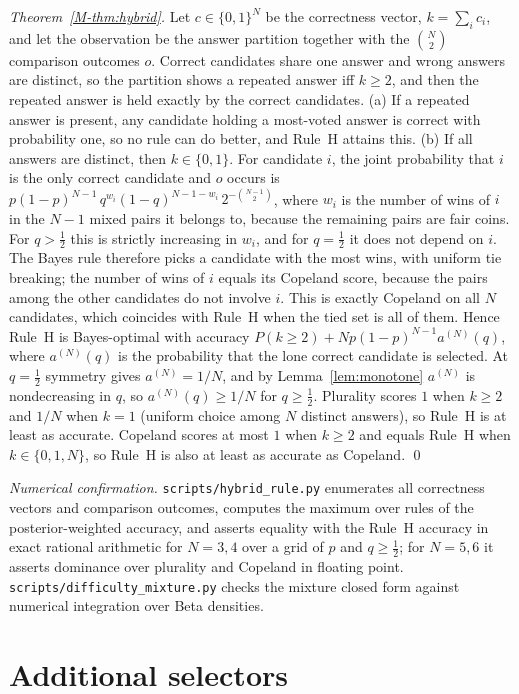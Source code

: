 \emph{Theorem~\ref{M-thm:hybrid}.} Let $c\in\{0,1\}^N$ be the correctness vector, $k=\sum_i c_i$, and let the observation be
the answer partition together with the $\binom N2$ comparison outcomes $o$. Correct candidates share one answer and wrong
answers are distinct, so the partition shows a repeated answer iff $k\ge2$, and then the repeated answer is held exactly by the
correct candidates. (a) If a repeated answer is present, any candidate holding a most-voted answer is correct with
probability one, so no rule can do better, and Rule~H attains this. (b) If all answers are distinct, then $k\in\{0,1\}$. For
candidate $i$, the joint probability that $i$ is the only correct candidate and $o$ occurs is
$p(1-p)^{N-1}\,q^{w_i}(1-q)^{N-1-w_i}\,2^{-\binom{N-1}2}$, where $w_i$ is the number of wins of $i$ in the $N-1$ mixed pairs it
belongs to, because the remaining pairs are fair coins. For $q>\tfrac12$ this is strictly increasing in $w_i$, and for
$q=\tfrac12$ it does not depend on $i$. The Bayes rule therefore picks a candidate with the most wins, with uniform tie
breaking; the number of wins of $i$ equals its Copeland score, because the pairs among the other candidates do not
involve $i$. This is exactly Copeland on all $N$ candidates, which coincides with Rule~H when the tied set is all of them.
Hence Rule~H is Bayes-optimal with accuracy $P(k\ge2)+Np(1-p)^{N-1}a^{(N)}(q)$, where $a^{(N)}(q)$ is the probability
that the lone correct candidate is selected. At $q=\tfrac12$ symmetry gives $a^{(N)}=1/N$, and by Lemma~\ref{lem:monotone}
$a^{(N)}$ is nondecreasing in $q$, so $a^{(N)}(q)\ge1/N$ for $q\ge\tfrac12$. Plurality scores $1$ when $k\ge2$ and $1/N$
when $k=1$ (uniform choice among $N$ distinct answers), so Rule~H is at least as accurate. Copeland scores at most $1$ when
$k\ge2$ and equals Rule~H when $k\in\{0,1,N\}$, so Rule~H is also at least as accurate as Copeland. \qed

\emph{Numerical confirmation.} \texttt{scripts/hybrid\_rule.py} enumerates all correctness vectors and comparison outcomes,
computes the maximum over rules of the posterior-weighted accuracy, and asserts equality with the Rule~H accuracy in exact
rational arithmetic for $N=3,4$ over a grid of $p$ and $q\ge\tfrac12$; for $N=5,6$ it asserts dominance over plurality and
Copeland in floating point. \texttt{scripts/difficulty\_mixture.py} checks the mixture closed form against numerical integration
over Beta densities.

\section{Additional selectors}
\label{sec:baselines}

